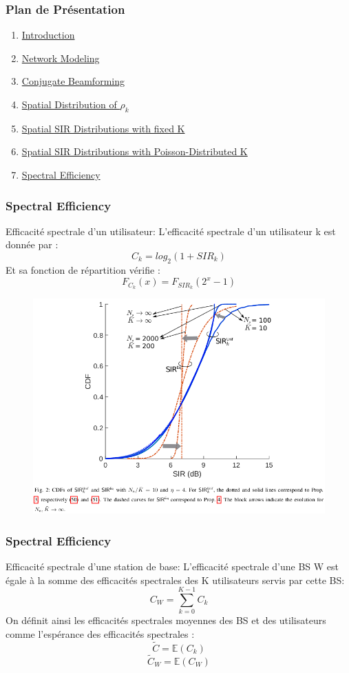 \documentclass[pdf]{beamer}
\begin{document}
\begin{frame}
\frametitle{Plan de Présentation }
\begin{enumerate}
	\item \hyperlink{Introduction}{Introduction}
	\item \hyperlink{networkModeling}{Network Modeling}
	\item \hyperlink{conjugateBeamforming}{Conjugate Beamforming}
	\item \hyperlink{spatialDistribution}{Spatial Distribution of $\rho_k$}
	\item \hyperlink{spatialsir}{Spatial SIR Distributions with fixed K}
	\item \hyperlink{spatialsirk}{Spatial SIR Distributions with Poisson-Distributed K}
	\item \hyperlink{spectralEfficiency}{Spectral Efficiency}
\end{enumerate}
\end{frame}

\begin{frame}[label=spectralEfficiency]
\frametitle{Spectral Efficiency}
\begin{exampleblock}{Efficacité spectrale d'un utilisateur:}
L'efficacité spectrale d'un utilisateur k est donnée par : 
$$C_k = log_2(1+SIR_k)$$
Et sa fonction de répartition vérifie : $$F_{C_k}(x)= F_{SIR_k}(2^x-1)$$
\begin{figure}
	\includegraphics[width=0.5\linewidth]{5}
\end{figure}
\end{exampleblock}
\end{frame}

\begin{frame}[label=spectralEfficiency]
\frametitle{Spectral Efficiency}
\begin{exampleblock}{Efficacité spectrale d'une station de base:}
L'efficacité spectrale d'une BS W est égale à la somme des efficacités spectrales des K utilisateurs servis par cette BS: 
$$C_W = \sum_{k=0}^{K-1}C_k$$
On définit ainsi les efficacités spectrales moyennes des BS et des utilisateurs comme l'espérance des efficacités spectrales : $$\tilde{C}= \mathbb{E}(C_k)$$
$$\tilde{C}_W= \mathbb{E}(C_W)$$
\end{exampleblock}
\end{frame}
\end{document}
